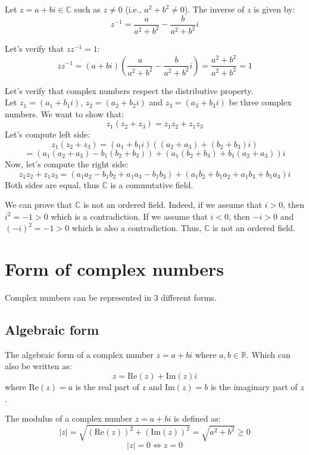 \begin{definition}
    Let $z = a + bi \in \mathbb{C}$ such as $z \neq 0$ (i.e., $a^2 + b^2 \neq 0$). The inverse of $z$ is given by:
    \[
        z^{-1} = \frac{a}{a^2 + b^2} - \frac{b}{a^2 + b^2}i
    \]
\end{definition}
Let's verify that $z z^{-1} = 1$:
\[
    z z^{-1} = (a + bi) \left( \frac{a}{a^2 + b^2} - \frac{b}{a^2 + b^2}i \right) = \frac{a^2 + b^2}{a^2 + b^2} = 1
\]
\begin{eg}
    Let's verify that complex numbers respect the distributive property. \\ Let $z_1 = (a_1 + b_1 i)$, $z_2 = (a_2 + b_2 i)$ and $z_3 = (a_3 + b_3 i)$ be three complex numbers. We want to show that:
    \[
        z_1(z_2 + z_3) = z_1 z_2 + z_1 z_3
    \]
    Let's compute left side:
    \[
        z_1(z_2 + z_3) = (a_1 + b_1 i)((a_2 + a_3) + (b_2 + b_3)i)
    \]
    \[
        = (a_1(a_2 + a_3) - b_1(b_2 + b_3)) + (a_1(b_2 + b_3) + b_1(a_2 + a_3))i
    \]
    Now, let's compute the right side:
    \[
        z_1 z_2 + z_1 z_3 = (a_1 a_2 - b_1 b_2 + a_1 a_3 - b_1 b_3) + (a_1 b_2 + b_1 a_2 + a_1 b_3 + b_1 a_3)i
    \]
    Both sides are equal, thus $\mathbb{C}$ is a commutative field.
\end{eg}
We can prove that $\mathbb{C}$ is not an ordered field. Indeed, if we assume that $i > 0$, then $i^2 = -1 > 0$ which is a contradiction. If we assume that $i < 0$, then $-i > 0$ and $(-i)^2 = -1 > 0$ which is also a contradiction. Thus, $\mathbb{C}$ is not an ordered field.

\section{Form of complex numbers}
Complex numbers can be represented in 3 different forms.
\subsection{Algebraic form}
\begin{definition}
    The algebraic form of a complex number $z = a + bi$ where $a, b \in \mathbb{R}$. Which can also be written as:
    \[
        z = \text{Re}(z) + \text{Im}(z)i
    \]
    where $\text{Re}(z) = a$ is the real part of $z$ and $\text{Im}(z) = b$ is the imaginary part of $z$.
\end{definition}
The modulus of a complex number $z = a + bi$ is defined as:
\[
    |z| = \sqrt{(\text{Re} (z))^2 + (\text{Im} (z))^2} = \sqrt{a^2 + b^2} \geq 0
\]
\[
    |z| = 0 \iff z = 0
\]


